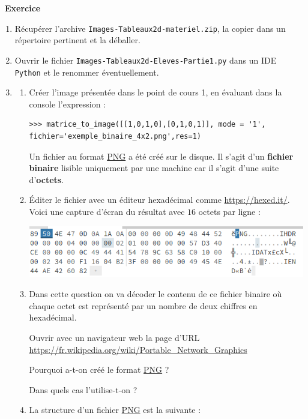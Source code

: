 \documentclass[a4paper, french, 12pt]{article}
\newcounter{exo}
\newenvironment{exercice}[1]
{\par \medskip   \addtocounter{exo}{1} \noindent  
\begin{bclogo}[arrondi =0.1,   noborder = true, logo=\bccrayon, marge=4]{~\textbf{Exercice} \textbf{\theexo} {\itshape #1} }  \par}
{
\end{bclogo}
 \par \bigskip }
\newcounter{cours}
\begin{document}
\begin{exercice}{}
\begin{enumerate}
	\item Récupérer l'archive  \texttt{Images-Tableaux2d-materiel.zip}, la copier dans un répertoire pertinent et la déballer.
	\item Ouvrir le fichier \texttt{Images-Tableaux2d-Eleves-Partie1.py} dans un IDE \texttt{Python} et le renommer éventuellement.
	\item 
\begin{enumerate}
\item Créer l'image présentée dans le point de cours 1, en évaluant dans la console l'expression :
\begin{lstlisting}[style=compil]
>>> matrice_to_image([[1,0,1,0],[0,1,0,1]], mode = '1', fichier='exemple_binaire_4x2.png',res=1)
\end{lstlisting}
Un fichier au format \href{https://fr.wikipedia.org/wiki/Portable_Network_Graphics}{PNG} a été créé sur le disque. Il s'agit d'un \textbf{fichier binaire}  lisible uniquement par une machine car il s'agit d'une suite d'\textbf{octets}.
\item Éditer le fichier avec un éditeur hexadécimal comme \href{https://hexed.it/}{https://hexed.it/}.  Voici une capture d'écran du résultat avec $16$ octets par ligne :

\begin{center}
\includegraphics[scale=0.8]{images/exemple_binaire_hex.png}
\end{center}


\item Dans cette question on va décoder le contenu de ce fichier binaire où chaque octet est représenté par un nombre de deux chiffres en hexadécimal.

Ouvrir avec un navigateur web la page d'URL \url{https://fr.wikipedia.org/wiki/Portable_Network_Graphics}

Pourquoi a-t-on créé le format \href{https://fr.wikipedia.org/wiki/Portable_Network_Graphics}{PNG}  ? 

Dans quels cas l'utilise-t-on ?

\item La structure d'un fichier \href{https://fr.wikipedia.org/wiki/Portable_Network_Graphics}{PNG} est la suivante :


\end{enumerate}
\end{enumerate}
\end{exercice}
\end{document}
